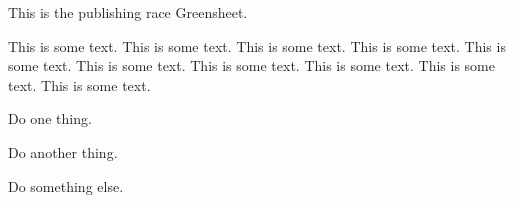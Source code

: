 \documentclass[green]{guildcamp3}
\begin{document}
	
	\name{\gPublishing{}}
	
	
	
	
	This is the publishing race Greensheet.
	
	This is some text.  This is some text.  This is some text.  This is
	some text.  This is some text.  This is some text.  This is some text.
	This is some text.  This is some text.  This is some text.
	
	
	\begin{enum}[Directions]
		\item Do one thing.
		\item Do another thing.
		\item Do something else.
	\end{enum}
	
	
\end{document}
